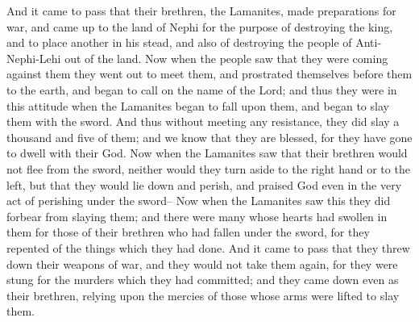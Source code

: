And it came to pass that their brethren, the Lamanites, made preparations for war, and came up to the land of Nephi for the purpose of destroying the king, and to place another in his stead, and also of destroying the people of Anti-Nephi-Lehi out of the land.
\bverse \iffalse Now when the people saw that they were coming against them they went out to meet them, and prostrated themselves before them to the earth, and began to call on the name of the Lord; and thus they were in this attitude when the Lamanites began to fall upon them, and began to slay them with the sword. \fi
Now when the people saw that they were coming against them they went out to meet them, and prostrated themselves before them to the earth, and began to call on the name of the Lord; and thus they were in this attitude when the Lamanites began to fall upon them, and began to slay them with the sword.
\bverse \iffalse And thus without meeting any resistance, they did slay a thousand and five of them; and we know that they are blessed, for they have gone to dwell with their God. \fi
And thus without meeting any resistance, they did slay a thousand and five of them; and we know that they are blessed, for they have gone to dwell with their God.
\bverse \iffalse Now when the Lamanites saw that their brethren would not flee from the sword, neither would they turn aside to the right hand or to the left, but that they would lie down and perish, and praised God even in the very act of perishing under the sword-- \fi
Now when the Lamanites saw that their brethren would not flee from the sword, neither would they turn aside to the right hand or to the left, but that they would lie down and perish, and praised God even in the very act of perishing under the sword--
\bverse \iffalse Now when the Lamanites saw this they did forbear from slaying them; and there were many whose hearts had swollen in them for those of their brethren who had fallen under the sword, for they repented of the things which they had done. \fi
Now when the Lamanites saw this they did forbear from slaying them; and there were many whose hearts had swollen in them for those of their brethren who had fallen under the sword, for they repented of the things which they had done.
\bverse \iffalse And it came to pass that they threw down their weapons of war, and they would not take them again, for they were stung for the murders which they had committed; and they came down even as their brethren, relying upon the mercies of those whose arms were lifted to slay them. \fi
And it came to pass that they threw down their weapons of war, and they would not take them again, for they were stung for the murders which they had committed; and they came down even as their brethren, relying upon the mercies of those whose arms were lifted to slay them.
